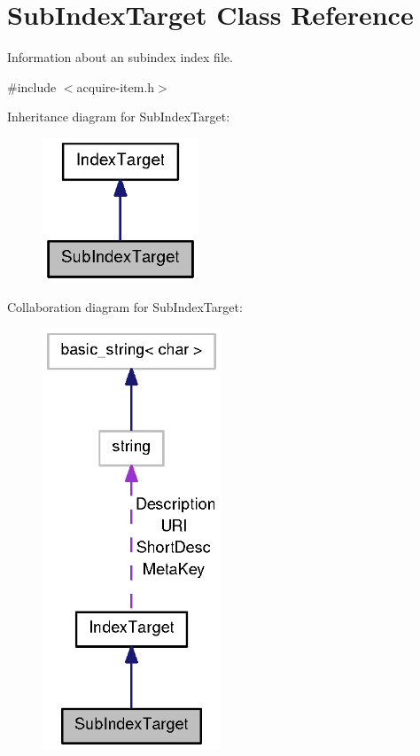 \section{\-Sub\-Index\-Target \-Class \-Reference}
\label{classSubIndexTarget}


\-Information about an subindex index file.  




{\ttfamily \#include $<$acquire-\/item.\-h$>$}



\-Inheritance diagram for \-Sub\-Index\-Target\-:
\nopagebreak
\begin{figure}[H]
\begin{center}
\leavevmode
\includegraphics[width=132pt]{classSubIndexTarget__inherit__graph}
\end{center}
\end{figure}


\-Collaboration diagram for \-Sub\-Index\-Target\-:
\nopagebreak
\begin{figure}[H]
\begin{center}
\leavevmode
\includegraphics[width=151pt]{classSubIndexTarget__coll__graph}
\end{center}
\end{figure}


